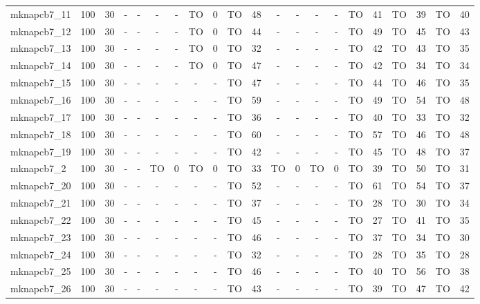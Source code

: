 \begin{sidewaystable}[!ht]
{\begin{tabular}{lcccccccccccccccccccc}
mknapcb7\_11 & 100 & 30 &  - &  - &  - &  - & TO & 0 & TO & 48 &  - &  - &  - &  - & TO & 41 & TO & 39 & TO & 40 \\
mknapcb7\_12 & 100 & 30 &  - &  - &  - &  - & TO & 0 & TO & 44 &  - &  - &  - &  - & TO & 49 & TO & 45 & TO & 43 \\
mknapcb7\_13 & 100 & 30 &  - &  - &  - &  - & TO & 0 & TO & 32 &  - &  - &  - &  - & TO & 42 & TO & 43 & TO & 35 \\
mknapcb7\_14 & 100 & 30 &  - &  - &  - &  - & TO & 0 & TO & 47 &  - &  - &  - &  - & TO & 42 & TO & 34 & TO & 34 \\
mknapcb7\_15 & 100 & 30 &  - &  - &  - &  - &  - &  - & TO & 47 &  - &  - &  - &  - & TO & 44 & TO & 46 & TO & 35 \\
mknapcb7\_16 & 100 & 30 &  - &  - &  - &  - &  - &  - & TO & 59 &  - &  - &  - &  - & TO & 49 & TO & 54 & TO & 48 \\
mknapcb7\_17 & 100 & 30 &  - &  - &  - &  - &  - &  - & TO & 36 &  - &  - &  - &  - & TO & 40 & TO & 33 & TO & 32 \\
mknapcb7\_18 & 100 & 30 &  - &  - &  - &  - &  - &  - & TO & 60 &  - &  - &  - &  - & TO & 57 & TO & 46 & TO & 48 \\
mknapcb7\_19 & 100 & 30 &  - &  - &  - &  - &  - &  - & TO & 42 &  - &  - &  - &  - & TO & 45 & TO & 48 & TO & 37 \\
mknapcb7\_2 & 100 & 30 &  - &  - & TO & 0 & TO & 0 & TO & 33 & TO & 0 & TO & 0 & TO & 39 & TO & 50 & TO & 31 \\
mknapcb7\_20 & 100 & 30 &  - &  - &  - &  - &  - &  - & TO & 52 &  - &  - &  - &  - & TO & 61 & TO & 54 & TO & 37 \\
mknapcb7\_21 & 100 & 30 &  - &  - &  - &  - &  - &  - & TO & 37 &  - &  - &  - &  - & TO & 28 & TO & 30 & TO & 34 \\
mknapcb7\_22 & 100 & 30 &  - &  - &  - &  - &  - &  - & TO & 45 &  - &  - &  - &  - & TO & 27 & TO & 41 & TO & 35 \\
mknapcb7\_23 & 100 & 30 &  - &  - &  - &  - &  - &  - & TO & 46 &  - &  - &  - &  - & TO & 37 & TO & 34 & TO & 30 \\
mknapcb7\_24 & 100 & 30 &  - &  - &  - &  - &  - &  - & TO & 32 &  - &  - &  - &  - & TO & 28 & TO & 35 & TO & 28 \\
mknapcb7\_25 & 100 & 30 &  - &  - &  - &  - &  - &  - & TO & 46 &  - &  - &  - &  - & TO & 40 & TO & 56 & TO & 38 \\
mknapcb7\_26 & 100 & 30 &  - &  - &  - &  - &  - &  - & TO & 43 &  - &  - &  - &  - & TO & 39 & TO & 47 & TO & 42 \\

\end{tabular}}
\end{sidewaystable}
